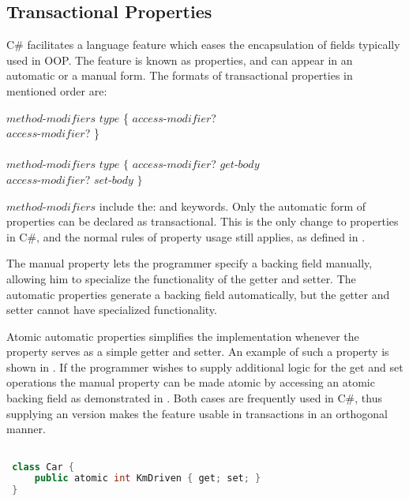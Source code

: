 \subsection{Transactional Properties}\label{subsec:design_properties}
C\# facilitates a language feature which eases the encapsulation of fields typically used in \ac{OOP}. The feature is known as properties, and can appear in an automatic or a manual form. The formats of transactional properties in mentioned order are\cite[p. 52]{sestoft2011c}:

 $method$-$modifiers$ $type$  \{ $access$-$modifier$? \bscode{;} \\ $access$-$modifier$? \bscode{;} \}
\\\\
$method$-$modifiers$ $type$  $\{$ $access$-$modifier$?  $get$-$body$ \\ $access$-$modifier$?  $set$-$body$ $\}$

$method$-$modifiers$ include the:      and  keywords.
Only the automatic form of properties can be declared as transactional. This is the only change to properties in C\#, and the normal rules of property usage still applies, as defined in \cite[p. 52]{sestoft2011c}.

The manual property lets the programmer specify a backing field manually, allowing him to specialize the functionality of the getter and setter. The automatic properties generate a backing field automatically, but the getter and setter cannot have specialized functionality.

Atomic automatic properties simplifies the implementation whenever the property serves as a simple getter and setter. An example of such a property is shown in . If the programmer wishes to supply additional logic for the get and set operations the manual property can be made atomic by accessing an atomic backing field as demonstrated in . Both cases are frequently used in C\#, thus supplying an  version makes the feature usable in transactions in an orthogonal manner.

\begin{lstlisting}[label=lst:auto_atomic_property,
 caption={Automatic Transactional Properties},
 language=Java, 
 showspaces=false,
 showtabs=false,
 breaklines=true,
 showstringspaces=false,
 breakatwhitespace=true,
 commentstyle=\color{greencomments},
 keywordstyle=\color{bluekeywords},
 stringstyle=\color{redstrings},
 morekeywords={atomic, retry, orElse, var, get, set}]  % Start your code-block

 class Car {
     public atomic int KmDriven { get; set; }
 }
\end{lstlisting}

